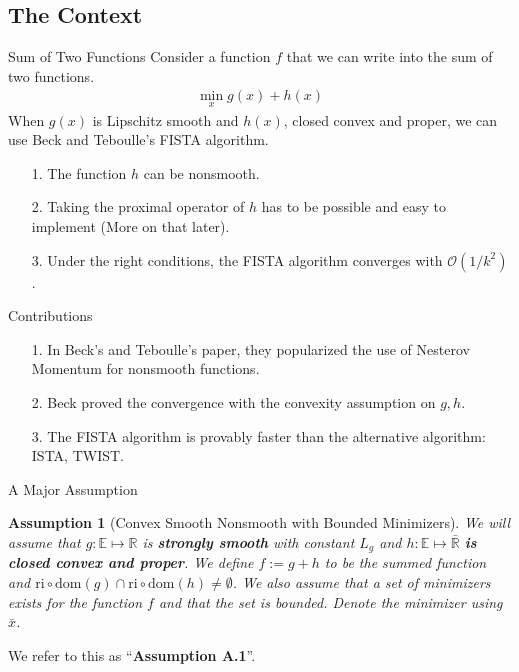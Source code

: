 \documentclass[11pt]{beamer}
\newtheorem{assumption}{Assumption}
\begin{document}
    \subsection{The Context}
        \begin{frame}{Sum of Two Functions}
            Consider a function $f$ that we can write into the sum of two functions. 
            \begin{align}
                \min_{x} g(x) + h(x)
            \end{align}  
            When $g(x)$ is Lipschitz smooth and $h(x)$, closed convex and proper, we can use Beck and Teboulle's FISTA algorithm. 
            \begin{itemize}
                \item [1.] The function $h$ can be nonsmooth. 
                \item [2.] Taking the proximal operator of $h$ has to be possible and easy to implement (More on that later).
                \item [3.] Under the right conditions, the FISTA algorithm converges with $\mathcal O(1/k^2)$. 
            \end{itemize}
        \end{frame}
        \begin{frame}{Contributions}
            \begin{itemize}
                \item [1.] In Beck's and Teboulle's paper\cite{paper:FISTA}, they popularized the use of Nesterov Momentum for nonsmooth functions. 
                \item [2.] Beck proved the convergence with the convexity assumption on $g, h$. 
                \item [3.] The FISTA algorithm is provably faster than the alternative algorithm: ISTA, TWIST. 
            \end{itemize}
        \end{frame}
        \begin{frame}{A Major Assumption}
            \begin{assumption}[Convex Smooth Nonsmooth with Bounded Minimizers]\label{assumption:1}
                We will assume that $g:\mathbb E\mapsto \mathbb R$ is \textbf{strongly smooth} with constant $L_g$ and $h:\mathbb E \mapsto \bar{\mathbb R}$ \textbf{is closed convex and proper}. We define $f := g + h$ to be the summed function and $\text{ri}\circ \text{dom}(g) \cap \text{ri}\circ \text{dom}(h) \neq \emptyset$. We also assume that a set of minimizers exists for the function $f$ and that the set is bounded. Denote the minimizer using $\bar x$. 
            \end{assumption}
            We refer to this as ``\textbf{Assumption A.1}''. 
        \end{frame}
\end{document}
